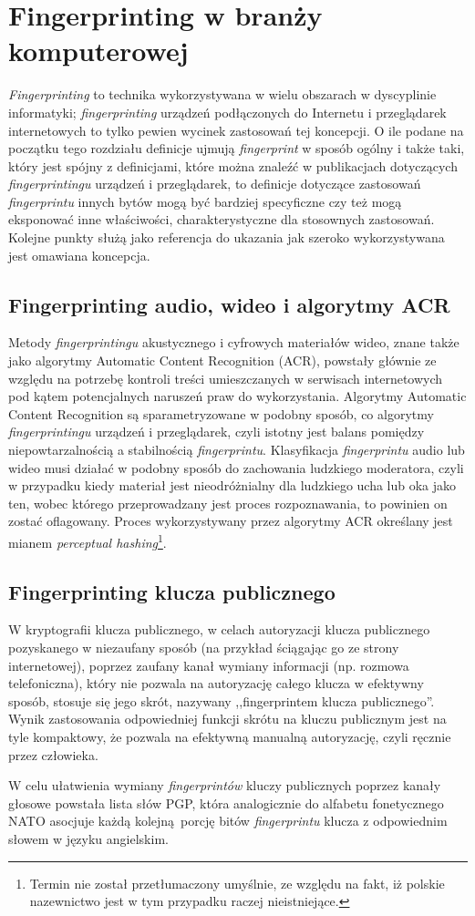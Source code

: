 \section{Fingerprinting w branży komputerowej}
\emph{Fingerprinting} to technika wykorzystywana w wielu obszarach w dyscyplinie
informatyki; \emph{fingerprinting} urządzeń podłączonych do Internetu i
przeglądarek internetowych to tylko pewien wycinek zastosowań tej koncepcji. O
ile podane na początku tego rozdziału definicje ujmują \emph{fingerprint} w
sposób ogólny i także taki, który jest spójny z definicjami, które można znaleźć
w publikacjach dotyczących \emph{fingerprintingu} urządzeń i przeglądarek, to
definicje dotyczące zastosowań \emph{fingerprintu} innych bytów mogą być
bardziej specyficzne czy też mogą eksponować inne właściwości, charakterystyczne
dla stosownych zastosowań. Kolejne punkty służą jako referencja do ukazania jak
szeroko wykorzystywana jest omawiana koncepcja.

\subsection{Fingerprinting audio, wideo i algorytmy ACR}
Metody \emph{fingerprintingu} akustycznego i cyfrowych materiałów wideo, znane
także jako algorytmy Automatic Content Recognition (ACR), powstały głównie ze
względu na potrzebę kontroli treści umieszczanych w serwisach internetowych pod
kątem potencjalnych naruszeń praw do wykorzystania. Algorytmy Automatic Content
Recognition są sparametryzowane w podobny sposób, co algorytmy
\emph{fingerprintingu} urządzeń i przeglądarek, czyli istotny jest balans
pomiędzy niepowtarzalnością a stabilnością \emph{fingerprintu}. Klasyfikacja
\emph{fingerprintu} audio lub wideo musi działać w podobny sposób do zachowania
ludzkiego moderatora, czyli w przypadku kiedy materiał jest nieodróżnialny dla
ludzkiego ucha lub oka jako ten, wobec którego przeprowadzany jest proces
rozpoznawania, to powinien on zostać oflagowany. Proces wykorzystywany przez
algorytmy ACR określany jest mianem \emph{perceptual hashing}\footnote{Termin
	nie został przetłumaczony umyślnie, ze	względu na fakt, iż polskie
nazewnictwo jest w tym przypadku raczej nieistniejące.}.

\subsection{Fingerprinting klucza publicznego}
W kryptografii klucza publicznego, w celach autoryzacji klucza publicznego
pozyskanego w niezaufany sposób (na przykład ściągając go ze strony
internetowej), poprzez zaufany kanał wymiany informacji (np. rozmowa
telefoniczna), który nie pozwala na autoryzację całego klucza w efektywny
sposób, stosuje się jego skrót, nazywany ,,fingerprintem klucza publicznego''.
Wynik zastosowania odpowiedniej funkcji skrótu na kluczu publicznym jest na tyle
kompaktowy, że pozwala na efektywną manualną autoryzację, czyli ręcznie przez
człowieka.

W celu ułatwienia wymiany \emph{fingerprintów} kluczy publicznych poprzez kanały
głosowe powstała lista słów PGP, która analogicznie do alfabetu fonetycznego
NATO asocjuje każdą kolejną porcję bitów \emph{fingerprintu} klucza z
odpowiednim słowem w języku angielskim.
